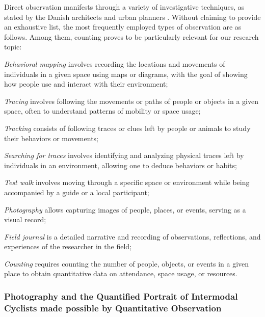 \begin{refsegment}
Direct observation manifests through a variety of investigative techniques, as stated by the Danish architects and urban planners \textcolor{blue}{\textcite[101-118]{gehl_vie_2019}}. Without claiming to provide an exhaustive list, the most frequently employed types of observation are as follows. Among them, counting proves to be particularly relevant for our research topic:
    \begin{customitemize}
\item \textsl{Behavioral mapping} involves recording the locations and movements of individuals in a given space using maps or diagrams, with the goal of showing how people use and interact with their environment;
\item \textsl{Tracing} involves following the movements or paths of people or objects in a given space, often to understand patterns of mobility or space usage;
\item \textsl{Tracking} consists of following traces or clues left by people or animals to study their behaviors or movements;
\item \textsl{Searching for traces} involves identifying and analyzing physical traces left by individuals in an environment, allowing one to deduce behaviors or habits;
\item \textsl{Test walk} involves moving through a specific space or environment while being accompanied by a guide or a local participant;
\item \textsl{Photography} allows capturing images of people, places, or events, serving as a visual record;
\item \textsl{Field journal} is a detailed narrative and recording of observations, reflections, and experiences of the researcher in the field;
\item \textsl{Counting} requires counting the number of people, objects, or events in a given place to obtain quantitative data on attendance, space usage, or resources.
    \end{customitemize}%
    
\subsubsection*{Photography and the Quantified Portrait of Intermodal Cyclists made possible by Quantitative Observation
    \label{chap3:enjeux-observation-quantitative}
    }


\end{refsegment}
